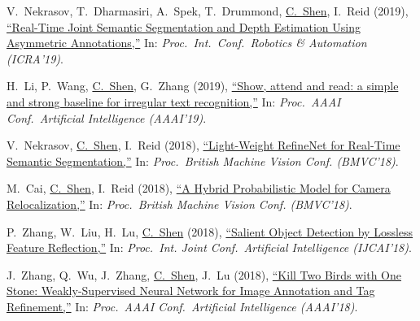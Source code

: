 \documentclass[9pt, a4paper]{article}
\newcommand{\years}[1]{\marginnote{\scriptsize #1}}
\def\highlight{\uline}
\begin{document}
\medskip

\years{2019} V.~Nekrasov, T.~Dharmasiri, A.~Spek, T.~Drummond, \highlight{C.~Shen}, I.~Reid (2019),
\href{http://www.google.com/search?lr=&ie=UTF-8&oe=UTF-8&q=Real-Time+Joint+Semantic+Segmentation+and+Depth+Estimation+Using+Asymmetric+Annotations+Vladimir+Nekrasov%2C+Thanuja+Dharmasiri%2C+Andrew+Spek%2C+Tom+Drummond%2C+Chunhua+Shen%2C+Ian+Reid}{``Real-Time Joint Semantic Segmentation and Depth Estimation Using Asymmetric Annotations,{}''}
In: \emph{Proc.\ Int.\ Conf.\  Robotics \& Automation (ICRA'19)}.

\medskip

\years{2019} H.~Li, P.~Wang, \highlight{C.~Shen}, G.~Zhang (2019),
\href{http://www.google.com/search?lr=&ie=UTF-8&oe=UTF-8&q=Show%2C+attend+and+read%3A+a+simple+and+strong+baseline+for+irregular+text+recognition+Hui+Li%2C+Peng+Wang%2C+Chunhua+Shen%2C+Guyu+Zhang}{``Show, attend and read: a simple and strong baseline for irregular text recognition,{}''}
In: \emph{Proc.\ AAAI Conf.\  Artificial Intelligence (AAAI'19)}.

\medskip

\years{2018} V.~Nekrasov, \highlight{C.~Shen}, I.~Reid (2018),
\href{http://www.google.com/search?lr=&ie=UTF-8&oe=UTF-8&q=Light-Weight+RefineNet+for+Real-Time+Semantic+Segmentation+Vladimir+Nekrasov%2C+Chunhua+Shen%2C+Ian+Reid}{``Light-Weight RefineNet for Real-Time Semantic Segmentation,{}''}
In: \emph{Proc.\ British Machine Vision Conf. (BMVC'18)}.

\medskip

\years{2018} M.~Cai, \highlight{C.~Shen}, I.~Reid (2018),
\href{http://www.google.com/search?lr=&ie=UTF-8&oe=UTF-8&q=A+Hybrid+Probabilistic+Model+for+Camera+Relocalization+Ming+Cai%2C+Chunhua+Shen%2C+Ian+Reid}{``A Hybrid Probabilistic Model for Camera Relocalization,{}''}
In: \emph{Proc.\ British Machine Vision Conf. (BMVC'18)}.

\medskip

\years{2018} P.~Zhang, W.~Liu, H.~Lu, \highlight{C.~Shen} (2018),
\href{http://www.google.com/search?lr=&ie=UTF-8&oe=UTF-8&q=Salient+Object+Detection+by+Lossless+Feature+Reflection+Pingping+Zhang%2C+Wei+Liu%2C+Huchuan+Lu%2C+Chunhua+Shen}{``Salient Object Detection by Lossless Feature Reflection,{}''}
In: \emph{Proc.\ Int. Joint Conf.\  Artificial Intelligence (IJCAI'18)}.

\medskip

\years{2018} J.~Zhang, Q.~Wu, J.~Zhang, \highlight{C.~Shen}, J.~Lu (2018),
\href{http://www.google.com/search?lr=&ie=UTF-8&oe=UTF-8&q=Kill+Two+Birds+with+One+Stone%3A+Weakly-Supervised+Neural+Network+for+Image+Annotation+and+Tag+Refinement+Junjie+Zhang%2C+Qi+Wu%2C+Jian+Zhang%2C+Chunhua+Shen%2C+Jianfeng+Lu}{``Kill Two Birds with One Stone: Weakly-Supervised Neural Network for Image Annotation and Tag Refinement,{}''}
In: \emph{Proc.\ AAAI Conf.\  Artificial Intelligence (AAAI'18)}.
\end{document}

